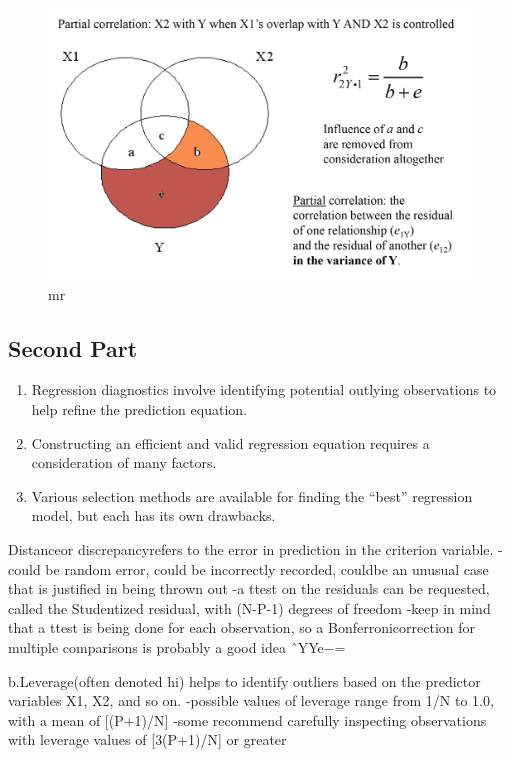 \documentclass[]{book}
\providecommand{\tightlist}{%
  \setlength{\itemsep}{0pt}\setlength{\parskip}{0pt}}
\theoremstyle{definition}
\theoremstyle{definition}
\theoremstyle{definition}
\theoremstyle{remark}
\begin{document}
\begin{figure}
\centering
\includegraphics{img/hicksmr18.png}
\caption{mr}
\end{figure}

\subsection{Second Part}\label{second-part}

\begin{enumerate}
\def\labelenumi{\arabic{enumi}.}
\tightlist
\item
  Regression diagnostics involve identifying potential outlying
  observations to help refine the prediction equation.
\item
  Constructing an efficient and valid regression equation requires a
  consideration of many factors.
\item
  Various selection methods are available for finding the ``best''
  regression model, but each has its own drawbacks.
\end{enumerate}

Distanceor discrepancyrefers to the error in prediction in the criterion
variable. -could be random error, could be incorrectly recorded, couldbe
an unusual case that is justified in being thrown out -a ttest on the
residuals can be requested, called the Studentized residual, with
(N-P-1) degrees of freedom -keep in mind that a ttest is being done for
each observation, so a Bonferronicorrection for multiple comparisons is
probably a good idea ˆYYe−=

b.Leverage(often denoted hi) helps to identify outliers based on the
predictor variables X1, X2, and so on. -possible values of leverage
range from 1/N to 1.0, with a mean of {[}(P+1)/N{]} -some recommend
carefully inspecting observations with leverage values of {[}3(P+1)/N{]}
or greater
\end{document}
